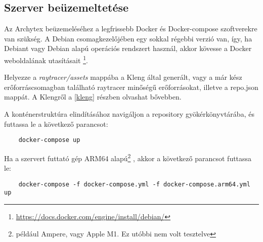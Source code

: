 \subsection{Szerver beüzemeltetése}\label{deploy}
Az Archytex beüzemeléséhez a legfrissebb Docker és Docker-compose szoftverekre van szükség. A Debian csomagkezelőjében egy sokkal régebbi verzió van, így, ha Debiant vagy Debian alapú operációs rendszert használ, akkor kövesse a Docker weboldalának utasításait \footnote{\url{https://docs.docker.com/engine/install/debian/}}.

Helyezze a \emph{raytracer/assets} mappába a Kleng által generált, vagy a már kész erőforráscsomagban található raytracer minőségű erőforrásokat, illetve a repo.json mappát. A Klengről a \ref{kleng} részben olvashat bővebben.

A konténerstruktúra elindításához navigáljon a repository gyökérkönyvtárába, és futtassa le a következő parancsot:
\begin{lstlisting}
    docker-compose up
\end{lstlisting}

Ha a szervert futtató gép ARM64 alapú\footnote{például Ampere, vagy Apple M1. Ez utóbbi nem volt tesztelve} , akkor a következő parancsot futtassa le:
\begin{lstlisting}
    docker-compose -f docker-compose.yml -f docker-compose.arm64.yml up
\end{lstlisting}
